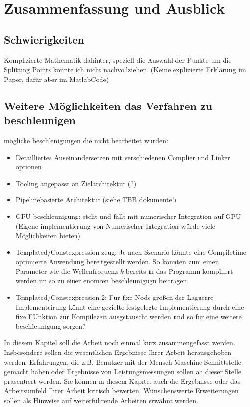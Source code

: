 \chapter{Zusammenfassung und Ausblick}

\section{Schwierigkeiten}

Komplizierte Mathematik dahinter, 
speziell die Auswahl der Punkte um die Splitting Points konnte ich nicht nachvollziehen. (Keine explizierte Erklärung im Paper, dafür aber im MatlabCode)


\section{Weitere Möglichkeiten das Verfahren zu beschleunigen}
mögliche beschlenigungen die nicht bearbeitet wurden:
\begin{itemize}
    \item Detailliertes Auseinandersetzen mit verschiedenen Complier und Linker optionen
    \item Tooling angepasst an Zielarchitektur (?)
    \item Pipelinebasierte Architektur (siehe TBB dokumente!)
    \item GPU beschleunigung: steht und fällt mit numerischer Integration auf GPU (Eigene implementierung von Numerischer Integration würde viele Möglichkeiten bieten)
    \item Templated/Constexpression zeug: Je nach Szenario könnte eine Compiletime optimierte Anwendung bereitgestellt werden. So könnten zum einen Parameter wie die Wellenfrequenz $k$ bereits in das Programm kompliiert werden un so zu einer enomren beschleunigugn beitragen.
    \item Templated/Constexpression 2: Für fixe Node größen der Laguerre Implementeirung könnt eine gezielte festgelegte Implementierung durch eine fixe FUnktion zur Kompilezeit ausgetauscht werden und so für eine weitere beschleunigung sorgen?
\end{itemize}

In diesem Kapitel soll die Arbeit noch einmal kurz zusammengefasst werden. Insbesondere sollen die wesentlichen Ergebnisse Ihrer Arbeit herausgehoben werden. Erfahrungen, die z.B. Benutzer mit der Mensch-Maschine-Schnittstelle gemacht haben oder Ergebnisse von Leistungsmessungen sollen an dieser Stelle präsentiert werden. Sie können in diesem Kapitel auch die Ergebnisse oder das Arbeitsumfeld Ihrer Arbeit kritisch bewerten. Wünschenswerte Erweiterungen sollen als Hinweise auf weiterführende Arbeiten erwähnt werden.
